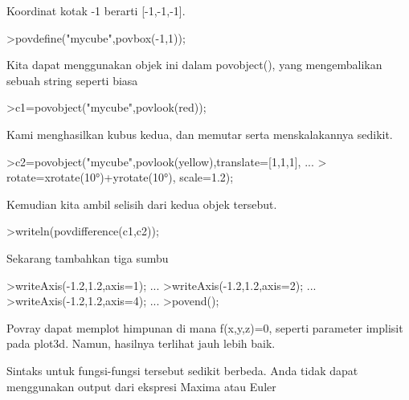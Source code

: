 \documentclass[12pt,Times new roman,letterpaper]{book}
\begin{document}
\begin{eulernootebook}
\begin{eulercomment}
\begin{eulercomment}
\begin{eulernootebook}
\begin{eulercomment}
\begin{eulercomment}
\begin{eulercomment}
\begin{eulercomment}
\begin{eulercomment}
\begin{eulercomment}
\begin{eulercomment}
\begin{eulernotebook}
\begin{eulercomment}
Koordinat kotak -1 berarti [-1,-1,-1].
\end{eulercomment}
\begin{eulerprompt}
>povdefine("mycube",povbox(-1,1));
\end{eulerprompt}
\begin{eulercomment}
Kita dapat menggunakan objek ini dalam povobject(), yang mengembalikan
sebuah string seperti biasa
\end{eulercomment}
\begin{eulerprompt}
>c1=povobject("mycube",povlook(red));
\end{eulerprompt}
\begin{eulercomment}
Kami menghasilkan kubus kedua, dan memutar serta menskalakannya
sedikit.
\end{eulercomment}
\begin{eulerprompt}
>c2=povobject("mycube",povlook(yellow),translate=[1,1,1], ...
>  rotate=xrotate(10°)+yrotate(10°), scale=1.2);
\end{eulerprompt}
\begin{eulercomment}
Kemudian kita ambil selisih dari kedua objek tersebut.
\end{eulercomment}
\begin{eulerprompt}
>writeln(povdifference(c1,c2));
\end{eulerprompt}
\begin{eulercomment}
Sekarang tambahkan tiga sumbu
\end{eulercomment}
\begin{eulerprompt}
>writeAxis(-1.2,1.2,axis=1); ...
>writeAxis(-1.2,1.2,axis=2); ...
>writeAxis(-1.2,1.2,axis=4); ...
>povend();
\end{eulerprompt}
\begin{eulercomment}
Povray dapat memplot himpunan di mana f(x,y,z)=0, seperti parameter
implisit pada plot3d. Namun, hasilnya terlihat jauh lebih baik.

Sintaks untuk fungsi-fungsi tersebut sedikit berbeda. Anda tidak dapat
menggunakan output dari ekspresi Maxima atau Euler


\end{eulercomment}
\end{eulernotebook}
\end{eulercomment}
\end{eulercomment}
\end{eulercomment}
\end{eulercomment}
\end{eulercomment}
\end{eulercomment}
\end{eulercomment}
\end{eulernootebook}
\end{eulercomment}
\end{eulercomment}
\end{eulernootebook}
\end{document}

